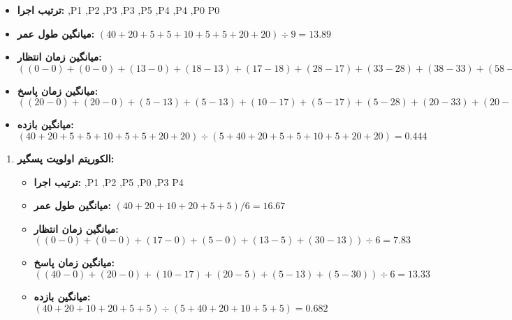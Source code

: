 \begin{qsolve}
	\begin{itemize}
		\item \textbf{ترتیب اجرا: },P1 ,P2 ,P3 ,P3 ,P5 ,P4 ,P4 ,P0 P0
		
		\item \textbf{میانگین طول عمر: }
		$  (40 + 20 + 5 + 5 + 10 + 5 + 5 + 20 + 20) \div 9 = 13.89 $
		
		\item \textbf{میانگین زمان انتظار: }
		$  ((0-0) + (0-0) + (13-0) + (18-13) + (17-18) + (28-17) + (33-28) + (38-33) + (58-38)) \div 9 = 7.33 $
		
		\item \textbf{میانگین زمان پاسخ: }
		$ ((20-0) + (20-0) + (5-13) + (5-13) + (10-17) + (5-17) + (5-28) + (20-33) + (20-58)) \div 9 = 11.89 $
		
		\item \textbf{میانگین بازده: }
		$ (40 + 20 + 5 + 5 + 10 + 5 + 5 + 20 + 20) \div (5 + 40 + 20 + 5 + 5 + 10 + 5 + 20 + 20) = 0.444 $
	\end{itemize}
	
	\begin{enumerate}
		\item \textbf{الکوریتم اولویت پسگیر: }
		\begin{itemize}
			\item \textbf{ترتیب اجرا: },P1 ,P2 ,P5 ,P0 ,P3 P4 
			
			\item \textbf{میانگین طول عمر: }
			$ (40 + 20 + 10 + 20 + 5 + 5) / 6 = 16.67 $
			
			\item \textbf{میانگین زمان انتظار: }
			$  ((0-0) + (0-0) + (17-0) + (5-0) + (13-5) + (30-13)) \div 6 = 7.83 $
			
			\item \textbf{میانگین زمان پاسخ: }
			$ ((40-0) + (20-0) + (10-17) + (20-5) + (5-13) + (5-30)) \div 6 = 13.33 $
			
			\item \textbf{میانگین بازده: }
			$ (40 + 20 + 10 + 20 + 5 + 5) \div (5 + 40 + 20 + 10 + 5 + 5) = 0.682 $
		\end{itemize}
	\end{enumerate}
	
\end{qsolve}










